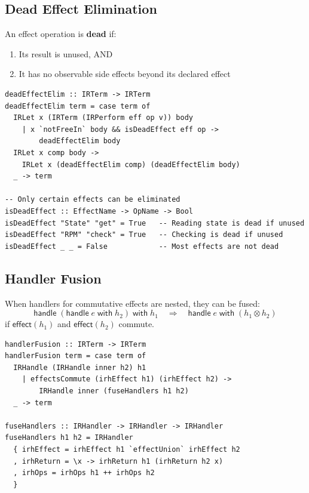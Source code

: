 \subsection{Dead Effect Elimination}
\label{subsec:dead-effect-elim}

\begin{definition}
\label{def:dead-effect-elim}
An effect operation is \textbf{dead} if:
\begin{enumerate}
  \item Its result is unused, AND
  \item It has no observable side effects beyond its declared effect
\end{enumerate}
\begin{verbatim}
deadEffectElim :: IRTerm -> IRTerm
deadEffectElim term = case term of
  IRLet x (IRTerm (IRPerform eff op v)) body
    | x `notFreeIn` body && isDeadEffect eff op ->
        deadEffectElim body
  IRLet x comp body ->
    IRLet x (deadEffectElim comp) (deadEffectElim body)
  _ -> term

-- Only certain effects can be eliminated
isDeadEffect :: EffectName -> OpName -> Bool
isDeadEffect "State" "get" = True   -- Reading state is dead if unused
isDeadEffect "RPM" "check" = True   -- Checking is dead if unused
isDeadEffect _ _ = False            -- Most effects are not dead
\end{verbatim}
\end{definition}

\subsection{Handler Fusion}
\label{subsec:handler-fusion}

\begin{definition}
\label{def:handler-fusion}
When handlers for commutative effects are nested, they can be fused:
\[
\mathsf{handle}\; (\mathsf{handle}\; e\; \mathsf{with}\; h_2)\; \mathsf{with}\; h_1 \quad \Rightarrow \quad \mathsf{handle}\; e\; \mathsf{with}\; (h_1 \otimes h_2)
\]
if $\mathsf{effect}(h_1)$ and $\mathsf{effect}(h_2)$ commute.
\begin{verbatim}
handlerFusion :: IRTerm -> IRTerm
handlerFusion term = case term of
  IRHandle (IRHandle inner h2) h1
    | effectsCommute (irhEffect h1) (irhEffect h2) ->
        IRHandle inner (fuseHandlers h1 h2)
  _ -> term

fuseHandlers :: IRHandler -> IRHandler -> IRHandler
fuseHandlers h1 h2 = IRHandler
  { irhEffect = irhEffect h1 `effectUnion` irhEffect h2
  , irhReturn = \x -> irhReturn h1 (irhReturn h2 x)
  , irhOps = irhOps h1 ++ irhOps h2
  }
\end{verbatim}
\end{definition}


